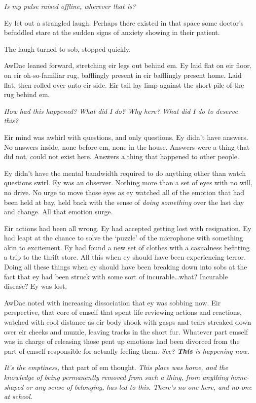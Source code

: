 \emph{Is my pulse raised offline, wherever that is?}

Ey let out a strangled laugh. Perhaps there existed in that space some doctor's befuddled stare at the sudden signs of anxiety showing in their patient.

The laugh turned to sob, stopped quickly.

AwDae leaned forward, stretching eir legs out behind em. Ey laid flat on eir floor, on eir oh-so-familiar rug, bafflingly present in eir bafflingly present home. Laid flat, then rolled over onto eir side. Eir tail lay limp against the short pile of the rug behind em.

\emph{How had this happened? What did I do? Why here? What did I do to deserve this?}

Eir mind was awhirl with questions, and only questions. Ey didn't have answers. No answers inside, none before em, none in the house. Answers were a thing that did not, could not exist here. Answers a thing that happened to other people.

Ey didn't have the mental bandwidth required to do anything other than watch questions swirl. Ey was an observer. Nothing more than a set of eyes with no will, no drive. No urge to move those eyes as ey watched all of the emotion that had been held at bay, held back with the sense of \emph{doing something} over the last day and change. All that emotion surge.

Eir actions had been all wrong. Ey had accepted getting lost with resignation. Ey had leapt at the chance to solve the `puzzle' of the microphone with something akin to excitement. Ey had found a new set of clothes with a casualness befitting a trip to the thrift store. All this when ey should have been experiencing terror. Doing all these things when ey should have been breaking down into sobs at the fact that ey had been struck with some sort of incurable\ldots{}what? Incurable disease? Ey was lost.

AwDae noted with increasing dissociation that ey was sobbing now. Eir perspective, that core of emself that spent life reviewing actions and reactions, watched with cool distance as eir body shook with gasps and tears streaked down over eir cheeks and muzzle, leaving tracks in the short fur. Whatever part emself was in charge of releasing those pent up emotions had been divorced from the part of emself responsible for actually feeling them. \emph{See? \textbf{This} is happening now.}

\emph{It's the emptiness,} that part of em thought. \emph{This place was home, and the knowledge of being permanently removed from such a thing, from anything home-shaped or any sense of belonging, has led to this. There's no one here, and no one at school.}

